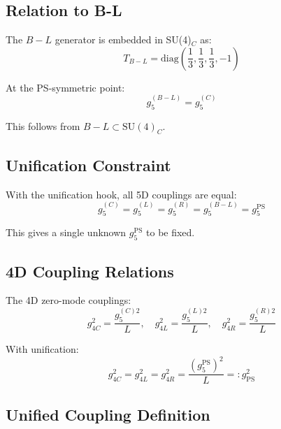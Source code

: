 \documentclass[11pt,a4paper]{article}
\theoremstyle{definition}
\begin{document}
\subsection{Relation to B-L}
\label{subsec:b-l-relation}

The $B-L$ generator is embedded in SU(4)$_C$ as:
\begin{equation}
\label{eq:bl-generator}
T_{B-L} = \text{diag}\left(\frac{1}{3}, \frac{1}{3}, \frac{1}{3}, -1\right)
\end{equation}

At the PS-symmetric point:
\begin{equation}
\label{eq:bl-coupling}
g_5^{(B-L)} = g_5^{(C)}
\end{equation}

This follows from $B-L \subset \text{SU}(4)_C$.

\subsection{Unification Constraint}
\label{subsec:unification-constraint}

With the unification hook, all 5D couplings are equal:
\begin{equation}
\label{eq:all-equal}
g_5^{(C)} = g_5^{(L)} = g_5^{(R)} = g_5^{(B-L)} = g_5^{\text{PS}}
\end{equation}

This gives a single unknown $g_5^{\text{PS}}$ to be fixed.

\subsection{4D Coupling Relations}
\label{subsec:4d-relations}

The 4D zero-mode couplings:
\begin{equation}
\label{eq:g4-from-g5}
g_{4C}^2 = \frac{g_5^{(C)2}}{L}, \quad
g_{4L}^2 = \frac{g_5^{(L)2}}{L}, \quad
g_{4R}^2 = \frac{g_5^{(R)2}}{L}
\end{equation}

With unification:
\begin{equation}
\label{eq:unified-g4}
g_{4C}^2 = g_{4L}^2 = g_{4R}^2 = \frac{(g_5^{\text{PS}})^2}{L} =: g_{\text{PS}}^2
\end{equation}

\subsection{Unified Coupling Definition}
\label{subsec:unified-alpha}
\end{document}
